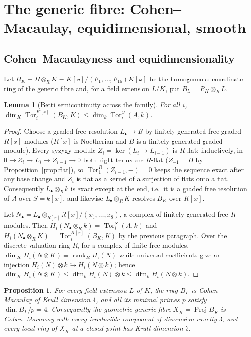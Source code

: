 \documentclass[11pt]{article}
\newtheorem{lemma}[theorem]{Lemma}
\newtheorem{proposition}[theorem]{Proposition}
\theoremstyle{definition}
\theoremstyle{remark}
\newcommand{\Proj}{\operatorname{Proj}}
\newcommand{\Tor}{\operatorname{Tor}}
\begin{document}
\section{The generic fibre: Cohen--Macaulay, equidimensional, smooth}
\label{sec:smooth}

\subsection{Cohen--Macaulayness and equidimensionality}

Let $B_K=B\otimes_RK=K[x]/(F_1,\ldots,F_{16})K[x]$ be the homogeneous
coordinate ring of the generic fibre and, for a field extension
$L/K$, put $B_L=B_K\otimes_KL$.

\begin{lemma}[Betti semicontinuity across the family]\label{lem:betti}
For all $i$,
$\dim_K\Tor_i^{K[x]}(B_K,K)\leq\dim_k\Tor_i^{S}(A,k)$.
\end{lemma}

\begin{proof}
Choose a graded free resolution $L_\bullet\to B$ by finitely generated free
graded $R[x]$-modules ($R[x]$ is Noetherian and $B$ is a finitely generated
graded module).  Every syzygy module
$Z_i=\ker(L_i\to L_{i-1})$ is $R$-flat: inductively, in
$0\to Z_i\to L_i\to Z_{i-1}\to0$ both right terms are $R$-flat ($Z_{-1}=B$
by Proposition~\ref{prop:flat}), so $\Tor^R_1(Z_{i-1},-)=0$ keeps the
sequence exact after any base change and $Z_i$ is flat as a kernel of a
surjection of flats onto a flat.  Consequently
$L_\bullet\otimes_Rk$ is exact except at the end, i.e.\ it is a graded free
resolution of $A$ over $S=k[x]$, and likewise $L_\bullet\otimes_RK$
resolves $B_K$ over $K[x]$.

Let $N_\bullet=L_\bullet\otimes_{R[x]}R[x]/(x_1,\ldots,x_8)$, a complex of
finitely generated free $R$-modules.  Then
$H_i(N_\bullet\otimes_Rk)=\Tor_i^S(A,k)$ and
$H_i(N_\bullet\otimes_RK)=\Tor_i^{K[x]}(B_K,K)$ by the previous paragraph.
Over the discrete valuation ring $R$, for a complex of finite free modules,
$\dim_KH_i(N\otimes K)=\operatorname{rank}_RH_i(N)$ while universal
coefficients give an injection $H_i(N)\otimes k\hookrightarrow
H_i(N\otimes k)$; hence
$\dim_KH_i(N\otimes K)\leq\dim_kH_i(N)\otimes k\leq
\dim_kH_i(N\otimes k)$.
\end{proof}

\begin{proposition}\label{prop:CM}
For every field extension $L$ of $K$, the ring $B_L$ is Cohen--Macaulay of
Krull dimension $4$, and all its minimal primes $p$ satisfy
$\dim B_L/p=4$.  Consequently the geometric generic fibre
$X_{\bar K}=\Proj B_{\bar K}$ is Cohen--Macaulay with every irreducible
component of dimension exactly $3$, and every local ring of $X_{\bar K}$ at
a closed point has Krull dimension $3$.
\end{proposition}
\end{document}
